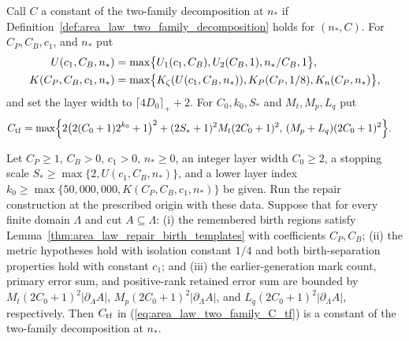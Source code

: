\begin{definition}
    \label{def:area_law_two_family_named_constant}
    \leanok
    Call $C$ a constant of the two-family decomposition at $n_*$ if
    Definition~\ref{def:area_law_two_family_decomposition} holds for $(n_*,C)$.
    For $C_P,C_B,c_1$, and $n_*$ put
    \begin{align}
        U(c_1,C_B,n_*)     & =\max\bigl\{U_1(c_1,C_B),U_2(C_B,1),n_*/C_B,1\bigr\}, \notag \\
        K(C_P,C_B,c_1,n_*) & =\max\bigl\{K_\zeta(U(c_1,C_B,n_*)),
        K_P(C_P,1/8),K_n(C_P,n_*)\bigr\},
        \label{eq:area_law_two_family_U_K}
    \end{align}
    and set the layer width to $\lceil4D_0\rceil_++2$. For $C_0,k_0,S_*$ and
    $M_t,M_p,L_q$ put
    \begin{align}
        C_{\rm tf} & =\max\Bigl\{
        2\bigl(2(C_0+1)2^{k_0}+1\bigr)^2+(2S_*+1)^2M_t(2C_0+1)^2,\,
        (M_p+L_q)(2C_0+1)^2\Bigr\}.
        \label{eq:area_law_two_family_C_tf}
    \end{align}
\end{definition}

\begin{lemma}
    \label{thm:area_law_two_family_named_constant}
    \leanok
    Let $C_P\ge1$, $C_B>0$, $c_1>0$, $n_*\ge0$, an integer layer width
    $C_0\ge2$, a stopping scale $S_*\ge\max\{2,U(c_1,C_B,n_*)\}$, and a lower
    layer index $k_0\ge\max\{50{,}000{,}000,K(C_P,C_B,c_1,n_*)\}$ be given. Run
    the repair construction at the prescribed origin with these data. Suppose
    that for every finite domain $\Lambda$ and cut $A\subseteq\Lambda$:
    (i) the remembered birth regions satisfy
    Lemma~\ref{thm:area_law_repair_birth_templates} with coefficients
    $C_P,C_B$; (ii) the metric hypotheses hold with isolation constant $1/4$ and
    both birth-separation properties hold with constant $c_1$; and (iii) the
    earlier-generation mark count, primary error sum, and positive-rank retained
    error sum are bounded by $M_t(2C_0+1)^2|\partial_\Lambda A|$,
    $M_p(2C_0+1)^2|\partial_\Lambda A|$, and
    $L_q(2C_0+1)^2|\partial_\Lambda A|$, respectively. Then $C_{\rm tf}$ in
    (\ref{eq:area_law_two_family_C_tf}) is a constant of the two-family
    decomposition at $n_*$.
\end{lemma}

